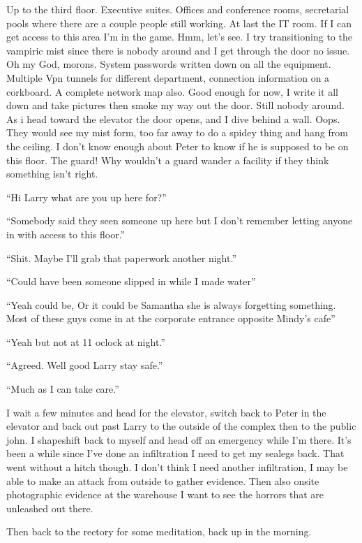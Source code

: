 Up to the third floor. Executive suites. Offices and conference rooms, secretarial pools where there are a couple people still working. At last the IT room. If I can get access to this area I'm in the game. Hmm, let's see. I try transitioning to the vampiric mist since there is nobody around and I get through the door no issue. Oh my God, morons. System passwords written down on all the equipment. Multiple Vpn tunnels for different department, connection information on a corkboard. A complete network map also. Good enough for now, I write it all down and take pictures then smoke my way out the door. Still nobody around. As i head toward the elevator the door opens, and I dive behind a wall. Oops. They would see my mist form, too far away to do a spidey thing and hang from the ceiling. I don't know enough about Peter to know if he is supposed to be on this floor. The guard! Why wouldn't a guard wander a facility if they think something isn't right.

``Hi Larry what are you up here for?''

``Somebody said they seen someone up here but I don't remember letting anyone in with access to this floor.''

``Shit. Maybe I'll grab that paperwork another night.''

``Could have been someone slipped in while I made water''

``Yeah could be, Or it could be Samantha she is always forgetting something. Most of these guys come in at the corporate entrance opposite Mindy's cafe''

``Yeah but not at 11 oclock at night.''

``Agreed. Well good Larry stay safe.''

``Much as I can take care.''

I wait a few minutes and head for the elevator, switch back to Peter in the elevator and back out past Larry to the outside of the complex then to the public john. I shapeshift back to myself and head off an emergency while I'm there. It's been a while since I've done an infiltration I need to get my sealegs back. That went without a hitch though. I don't think I need another infiltration, I may be able to make an attack from outside to gather evidence. Then also onsite photographic evidence at the warehouse I want to see the horrors that are unleashed out there.

Then back to the rectory for some meditation, back up in the morning.

